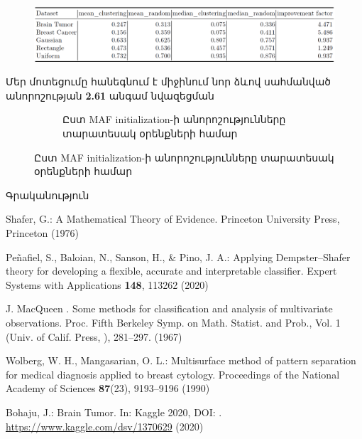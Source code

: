 \documentclass[aspectratio=169]{beamer}
\begin{document}
\begin{frame}
\begin{figure}
    \centering
    \includegraphics[width=1\linewidth]{score_df.png}
\end{figure}
Մեր մոտեցումը հանեգնում է միջինում նոր ձևով սահմանված անորոշության \textbf{2.61} անգամ նվազեցման
\end{frame}

\begin{figure}
\begin{figure}
    \caption{Ըստ { \rm MAF initialization}-ի անորոշությունները տարատեսակ օրենքների համար}
    \label{fig:bars}
\end{figure}
\end{figure}

\begin{frame}{Գրականություն}
    
\begin{thebibliography}{8}
{\rm
{}
Shafer, G.: A Mathematical Theory of Evidence. Princeton University Press, Princeton (1976)

Peñafiel, S., Baloian, N., Sanson, H., \& Pino, J. A.: Applying Dempster–Shafer theory for developing a flexible, accurate and interpretable classifier. Expert Systems with Applications \textbf{148}, 113262 (2020)

J. MacQueen . Some methods for classification and analysis of multivariate observations. Proc. Fifth Berkeley Symp. on Math. Statist. and Prob., Vol. 1 (Univ. of Calif. Press, ), 281--297. (1967)

Wolberg, W. H., Mangasarian, O. L.: Multisurface method of pattern separation for medical diagnosis applied to breast cytology. Proceedings of the National Academy of Sciences \textbf{87}(23), 9193--9196 (1990)

Bohaju, J.: Brain Tumor. In: Kaggle 2020, DOI: . \url{https://www.kaggle.com/dsv/1370629} (2020)
}
\end{thebibliography}
\end{frame}
\end{document}
